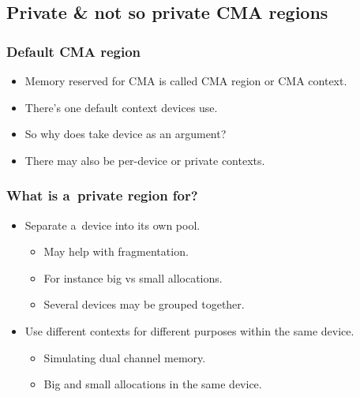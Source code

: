 
\subsection{Private \& not so private CMA regions}

\begin{frame}
  \frametitle{Default CMA region}

  \begin{itemize}
  \item Memory reserved for CMA is called CMA region or CMA context.
  \item There's one default context devices use.
  \item So why does  take
    device as an argument?
  \item There may also be per-device or private contexts.
  \end{itemize}
\end{frame}

\begin{frame}
  \frametitle{What is a~private region for?}

  \begin{itemize}
  \item Separate a~device into its own pool.
    \begin{itemize}
    \item May help with fragmentation.
    \item For instance big vs small allocations.
    \item Several devices may be grouped together.
    \end{itemize}
  \item Use different contexts for different purposes within the same
    device.
    \begin{itemize}
    \item Simulating dual channel memory.
    \item Big and small allocations in the same device.
    \end{itemize}
  \end{itemize}
\end{frame}

